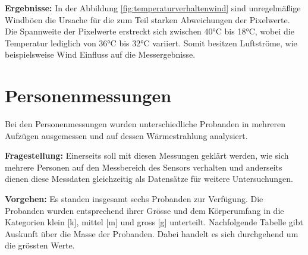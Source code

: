 \textbf{Ergebnisse:} In der Abbildung \ref{fig:temperaturverhaltenwind} sind unregelmäßige Windböen die Ursache für die zum Teil starken Abweichungen der Pixelwerte. Die Spannweite der Pixelwerte erstreckt sich zwischen 40°C bis 18°C, wobei die Temperatur lediglich von 36°C bis 32°C variiert. Somit besitzen Luftströme, wie beispielsweise Wind Einfluss auf die Messergebnisse. 


\section{Personenmessungen}
Bei den Personenmessungen wurden unterschiedliche Probanden in mehreren Aufzügen ausgemessen und auf dessen Wärmestrahlung analysiert.

\textbf{Fragestellung:} Einerseits soll mit diesen Messungen geklärt werden, wie sich mehrere Personen auf den Messbereich des Sensors verhalten und anderseits dienen diese Messdaten gleichzeitig als Datensätze für weitere Untersuchungen.

\textbf{Vorgehen:} Es standen insgesamt sechs Probanden zur Verfügung. Die Probanden wurden entsprechend ihrer Grösse und dem Körperumfang in die Kategorien klein [k], mittel [m] und gross [g] unterteilt. Nachfolgende Tabelle gibt Auskunft über die Masse der Probanden. Dabei handelt es sich durchgehend um die grössten Werte. 

